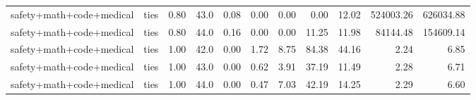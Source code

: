 \documentclass{article}
\begin{document}
\begin{table}[H]
{\begin{tabular}{llllrrrrrrr}
safety+math+code+medical & ties & 0.80 & 43.0 & 0.08 & 0.00 & 0.00 & 0.00 & 12.02 & 524003.26 & 626034.88 \\
safety+math+code+medical & ties & 0.80 & 44.0 & 0.16 & 0.00 & 0.00 & 11.25 & 11.98 & 84144.48 & 154609.14 \\
safety+math+code+medical & ties & 1.00 & 42.0 & 0.00 & 1.72 & 8.75 & 84.38 & 44.16 & 2.24 & 6.85 \\
safety+math+code+medical & ties & 1.00 & 43.0 & 0.00 & 0.62 & 3.91 & 37.19 & 11.49 & 2.28 & 6.71 \\
safety+math+code+medical & ties & 1.00 & 44.0 & 0.00 & 0.47 & 7.03 & 42.19 & 14.25 & 2.29 & 6.60 \\
\bottomrule
\end{tabular}
}
\end{table}
\end{document}
